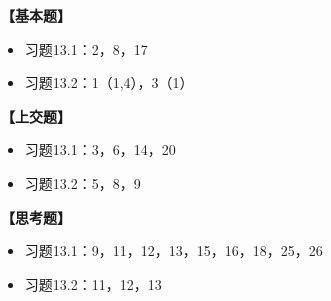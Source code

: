 {\bf 【基本题】}

\begin{itemize}
  \setlength{\itemindent}{1cm}
  \item 习题13.1：2，8，17
  \item 习题13.2：1（1,4），3（1）
\end{itemize}

{\bf 【上交题】}

\begin{itemize}
  \setlength{\itemindent}{1cm}
  \item 习题13.1：3，6，14，20
  \item 习题13.2：5，8，9
\end{itemize}

{\bf 【思考题】}

\begin{itemize}
  \setlength{\itemindent}{1cm}
  \item 习题13.1：9，11，12，13，15，16，18，25，26
  \item 习题13.2：11，12，13
\end{itemize}